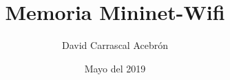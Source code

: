 \documentclass{book}
\title{Memoria Mininet-Wifi}
\author{David Carrascal Acebrón}
\date{Mayo del 2019}
\begin{document}
\maketitle
\tableofcontents{}
 
\end{document}
